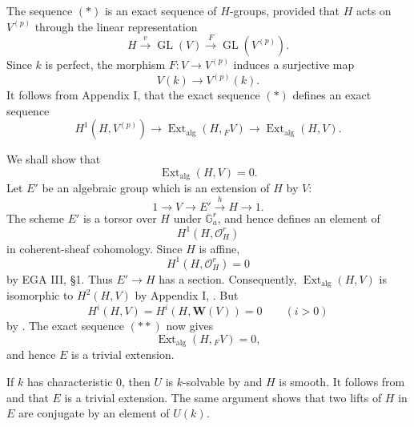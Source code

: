 

The sequence \((*)\) is an exact sequence of \(H\)-groups,
provided that \(H\) acts on \(V^{(p)}\) through the linear
representation
\[
  H\xrightarrow{v}\operatorname{GL}(V)
    \xrightarrow{F}\operatorname{GL}(V^{(p)}).
\]
Since \(k\) is perfect, the morphism \(F:V\to V^{(p)}\) induces
a surjective map
\[
  V(k)\longrightarrow V^{(p)}(k).
\]
It follows from Appendix I,  that the exact sequence \((*)\)
defines an exact sequence
\[
  \tag{**}\label{sga3:xvii:proposition:5-4-1:equation:double-star}
  H^1(H,V^{(p)})\longrightarrow
  \operatorname{Ext}_{\mathrm{alg}}(H,{}_F V)
  \longrightarrow
  \operatorname{Ext}_{\mathrm{alg}}(H,V).
\]

We shall show that
\[
  \operatorname{Ext}_{\mathrm{alg}}(H,V)=0.
\]
Let \(E'\) be an algebraic group which is an extension of \(H\)
by \(V\):
\[
  1\longrightarrow V\longrightarrow E'
    \xrightarrow{h}H\longrightarrow1.
\]
The scheme \(E'\) is a torsor over \(H\) under
\(\mathbb G_a^r\), and hence defines an element of
\[
  H^1(H,\mathcal O_H^r)
\]
in coherent-sheaf cohomology.  Since \(H\) is affine,
\[
  H^1(H,\mathcal O_H^r)=0
\]
by EGA III, \S1.  Thus \(E'\to H\) has a section.  Consequently,
\(\operatorname{Ext}_{\mathrm{alg}}(H,V)\) is isomorphic to
\(H^2(H,V)\) by Appendix I, .  But
\[
  H^i(H,V)=H^i(H,\mathbf W(V))=0\qquad(i>0)
\]
by .  The exact sequence \((**)\) now gives
\[
  \operatorname{Ext}_{\mathrm{alg}}(H,{}_F V)=0,
\]
and hence \(E\) is a trivial extension.


If \(k\) has characteristic \(0\), then \(U\) is \(k\)-solvable
by  and \(H\) is smooth.  It follows from  and
 that \(E\) is a trivial extension.  The same argument
shows that two lifts of \(H\) in \(E\) are conjugate by an
element of \(U(k)\).

